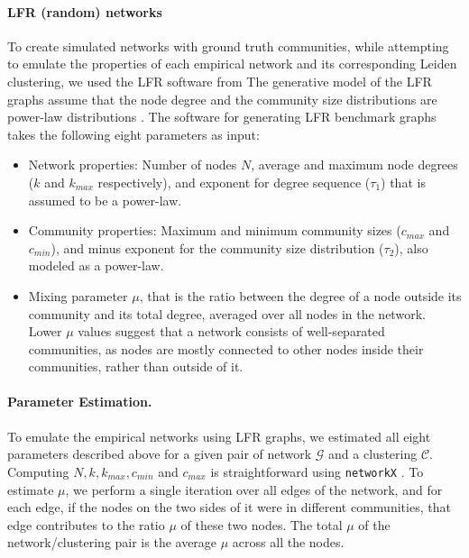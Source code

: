 \documentclass[11pt]{article}   	%
\begin{document}
\paragraph{LFR (random) networks}

To create simulated networks with ground truth communities, while attempting to emulate the properties of each empirical network and its corresponding Leiden clustering, we used the LFR software from \cite{lancichinetti2008benchmark}  The generative model of the LFR graphs assume that the node degree and the community size distributions are power-law distributions  \citep{albert2002statistical}.
The software for generating LFR benchmark graphs \citep{fortunato-resources} takes the following eight parameters as input:
\begin{itemize}
    \item  Network properties: Number of nodes $N$, average and maximum node degrees ($k$ and $k_{max}$ respectively), and exponent for degree sequence ($\tau_1$) that is assumed to be a power-law.
    \item Community properties: Maximum and minimum community sizes ($c_{max}$ and $c_{min}$), and minus exponent for the community size distribution ($\tau_2$), also modeled as a power-law.
    \item Mixing parameter $\mu$, that is the ratio between the degree of a node outside its community and its total degree, averaged over all nodes in the network. Lower $\mu$ values suggest that a network consists of well-separated communities, as nodes are mostly connected to other nodes inside their communities, rather than outside of it.
\end{itemize}






\paragraph{Parameter Estimation.} To emulate the empirical networks using LFR graphs, we estimated all eight parameters described above for a given pair of network $\mathcal{G}$ and a clustering $\mathcal{C}$. Computing $N, k, k_{max}, c_{min}$ and $c_{max}$ is straightforward using \texttt{networkX} \citep{hagberg2008exploring}. To estimate $\mu$, we perform a single iteration over all edges of the network, and for each edge, if the nodes on the two sides of it were in different communities, that edge contributes to the ratio $\mu$ of these two nodes. The total $\mu$ of the network/clustering pair is the average $\mu$ across all the nodes.
\end{document}
